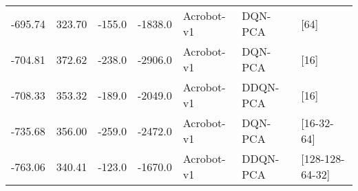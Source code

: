 \begin{tabular}{rrrrlll}
-695.74 &  323.70 & -155.0 & -1838.0 &      Acrobot-v1 &   DQN-PCA &             [64] \\
-704.81 &  372.62 & -238.0 & -2906.0 &      Acrobot-v1 &   DQN-PCA &             [16] \\
-708.33 &  353.32 & -189.0 & -2049.0 &      Acrobot-v1 &  DDQN-PCA &             [16] \\
-735.68 &  356.00 & -259.0 & -2472.0 &      Acrobot-v1 &   DQN-PCA &       [16-32-64] \\
-763.06 &  340.41 & -123.0 & -1670.0 &      Acrobot-v1 &  DDQN-PCA &  [128-128-64-32] \\
\bottomrule
\end{tabular}
